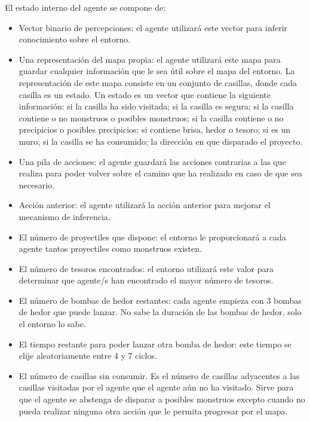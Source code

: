 El estado interno del agente se compone de:
\begin{itemize}
    \item Vector binario de percepciones: el agente utilizará este vector para inferir conocimiento sobre el entorno.
    
    \item Una representación del mapa propia: el agente utilizará este mapa para guardar cualquier información que le sea útil sobre el mapa del entorno. La representación de este mapa consiste en un conjunto de casillas, donde cada casilla es un estado. Un estado es un vector que contiene la siguiente información: si la casilla ha sido visitada; si la casilla es segura; si la casilla contiene o no monstruos o posibles monstruos; si la casilla contiene o no precipicios o posibles precipicios; si contiene brisa, hedor o tesoro; si es un muro; si la casilla se ha consumido; la dirección en que disparado el proyecto.
    
    \item Una pila de acciones: el agente guardará las acciones contrarias a las que realiza para poder volver sobre el camino que ha realizado en caso de que sea necesario.
    
    \item Acción anterior: el agente utilizará la acción anterior para mejorar el mecanismo de inferencia.
    
    \item El número de proyectiles que dispone: el entorno le proporcionará a cada agente tantos proyectiles como monstruos existen.
    
    \item El número de tesoros encontrados: el entorno utilizará este valor para determinar que agente/s han encontrado el mayor número de tesoros.
    
    \item El número de bombas de hedor restantes: cada agente empieza con 3 bombas de hedor que puede lanzar. No sabe la duración de las bombas de hedor, solo el entorno lo sabe.
    
    \item El tiempo restante para poder lanzar otra bomba de hedor: este tiempo se elije aleatoriamente entre 4 y 7 ciclos.
    
    \item El número de casillas sin consumir. Es el número de casillas adyacentes a las casillas visitadas por el agente que el agente aún no ha visitado. Sirve para que el agente se abstenga de disparar a posibles monstruos excepto cuando no pueda realizar ninguna otra acción que le permita progresar por el mapa.

\end{itemize}

